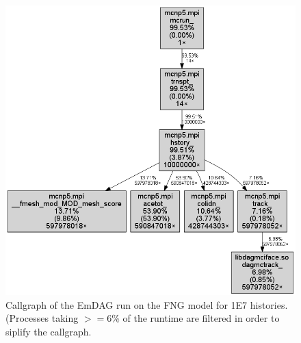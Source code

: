 \documentclass[12pt, a4paper]{article}
\begin{document}
\begin{figure}
  \centering
  \includegraphics[scale=0.35]{emdag_fng_cg_fine6.png}
  \caption{Callgraph of the EmDAG run on the FNG model for 1E7 histories. (Processes taking $>=$6\% of the runtime are filtered in order to siplify the callgraph.}
  \label{emdag-fng-coarse}  
\end{figure}
\end{document}

